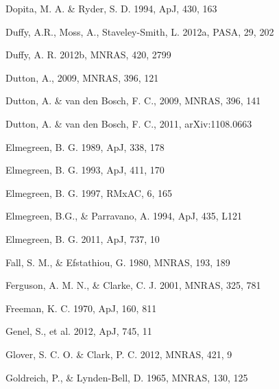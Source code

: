 \documentclass[12pt,preprint]{aastex}
\begin{document}
\begin{thebibliography}{}

 Dopita, M. A. \& Ryder, S. D. 1994, ApJ, 430, 163

         Duffy, A.R., Moss, A., Staveley-Smith, L.  2012a, PASA, 29, 202

 Duffy, A. R. 2012b, MNRAS, 420, 2799

Dutton, A., 2009, MNRAS, 396, 121

 Dutton, A. \& van den Bosch, F. C., 2009, MNRAS, 396, 141

 Dutton, A. \& van den Bosch, F. C., 2011, arXiv:1108.0663

Elmegreen, B. G. 1989, ApJ, 338, 178

Elmegreen, B. G. 1993, ApJ, 411, 170

 Elmegreen, B. G. 1997, RMxAC, 6, 165

Elmegreen, B.G., \& Parravano, A. 1994, ApJ, 435, L121

 Elmegreen, B. G. 2011, ApJ, 737, 10

 Fall, S. M., \& Efstathiou, G. 1980, MNRAS, 193, 189

 Ferguson, A. M. N., \& Clarke, C. J. 2001, MNRAS, 325, 781

 Freeman, K. C. 1970, ApJ, 160, 811




 Genel, S., et al. 2012, ApJ, 745, 11

  Glover, S. C. O. \& Clark, P. C. 2012, MNRAS, 421, 9


 Goldreich, P., \& Lynden-Bell, D. 1965, MNRAS, 130, 125


\end{thebibliography}
\end{document}
